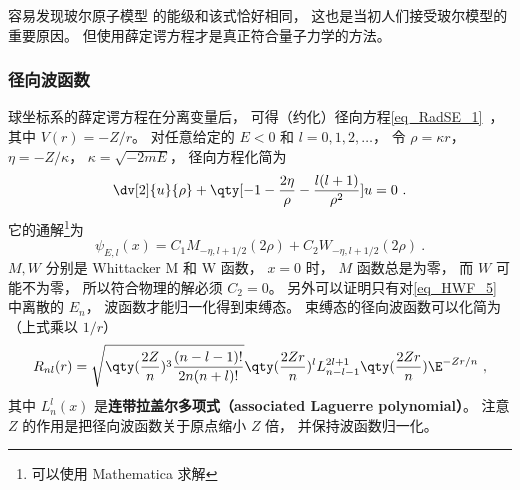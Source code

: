 容易发现玻尔原子模型 的能级和该式恰好相同， 这也是当初人们接受玻尔模型的重要原因。 但使用薛定谔方程才是真正符合量子力学的方法。

\subsubsection{径向波函数}
球坐标系的薛定谔方程在分离变量后， 可得（约化）径向方程\autoref{eq_RadSE_1}~， 其中 $V(r) = -Z/r$。 对任意给定的 $E < 0$ 和 $l = 0,1,2,\dots$， 令 $\rho = \kappa r$， $\eta = -Z/\kappa$， $\kappa = \sqrt{-2mE}$， 径向方程化简为
\begin{equation}
\dv[2]{u}{\rho} + \qty[-1 - \frac{2\eta}{\rho} - \frac{l(l+1)}{\rho^2}]u = 0~.
\end{equation}
它的通解\footnote{可以使用 Mathematica 求解}为
\begin{equation}\label{eq_HWF_6}
\psi_{E,l}(x) = C_1 M_{-\eta, l+1/2}(2 \rho) + C_2 W_{-\eta, l+1/2}(2 \rho)~.
\end{equation}
$M, W$ 分别是 Whittacker M 和 W 函数， $x = 0$ 时， $M$ 函数总是为零， 而 $W$ 可能不为零， 所以符合物理的解必须 $C_2 = 0$。 另外可以证明只有对\autoref{eq_HWF_5} 中离散的 $E_n$， 波函数才能归一化得到束缚态。 束缚态的径向波函数可以化简为（上式乘以 $1/r$）
\begin{equation}\label{eq_HWF_2}
R_{nl}(r) = \sqrt{\qty(\frac{2 Z}{n})^3 \frac{(n - l - 1)!}{2n (n + l)!}} \qty(\frac{2Zr}{n})^l  L_{n-l-1}^{2l+1}\qty(\frac{2Zr}{n}) \E^{-Zr/n}~,
\end{equation}
其中 $L_n^l(x)$ 是\textbf{连带拉盖尔多项式（associated Laguerre polynomial）}。 注意 $Z$ 的作用是把径向波函数关于原点缩小 $Z$ 倍， 并保持波函数归一化。

